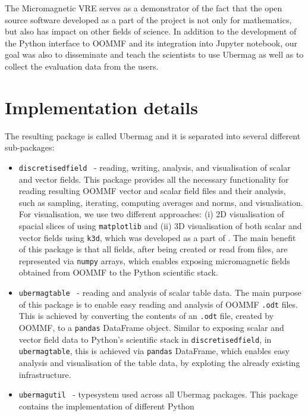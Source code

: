 \documentclass{deliverablereport}
\begin{document}
The Micromagnetic VRE serves as a demonstrator of the fact
that the open source software developed as a part of the \ODK project
is not only for mathematics, but also has impact on other fields of
science. In addition to the development of the Python interface to
OOMMF and its integration into Jupyter notebook, our goal was also to
disseminate and teach the scientists to use Ubermag as well as to
collect the evaluation data from the users.

\section{Implementation details}

The resulting package is called Ubermag and it is separated into
several different sub-packages:

\begin{itemize}
\item \texttt{discretisedfield}~\cite{discretisedfield} - reading,
  writing, analysis, and visualisation of scalar and vector
  fields. This package provides all the necessary functionality for
  reading resulting OOMMF vector and scalar field files and their
  analysis, such as sampling, iterating, computing averages and norms,
  and visualisation. For visualisation, we use two different
  approaches: (i) 2D visualisation of spacial slices of using
  \texttt{matplotlib} and (ii) 3D visualisation of both scalar and
  vector fields using \texttt{k3d}, which was developed as a part of
  \ODK. The main benefit of this package is that all fields, after
  being created or read from files, are represented via \texttt{numpy}
  arrays, which enables exposing micromagnetic fields obtained from
  OOMMF to the Python scientific stack.
\item \texttt{ubermagtable}~\cite{ubermagtable} - reading and analysis
  of scalar table data. The main purpose of this package is to enable
  easy reading and analysis of OOMMF \texttt{.odt} files. This is
  achieved by converting the contents of an \texttt{.odt} file,
  created by OOMMF, to a \texttt{pandas} DataFrame object. Similar to
  exposing scalar and vector field data to Python's scientific stack
  in \texttt{discretisedfield}, in \texttt{ubermagtable}, this is
  achieved via \texttt{pandas} DataFrame, which enables easy analysis
  and visualisation of the table data, by exploting the already
  existing infrastructure.
\item \texttt{ubermagutil}~\cite{ubermagutil} - typesystem used across all Ubermag
packages. This package contains the implementation of different Python

\end{itemize}
\end{document}
